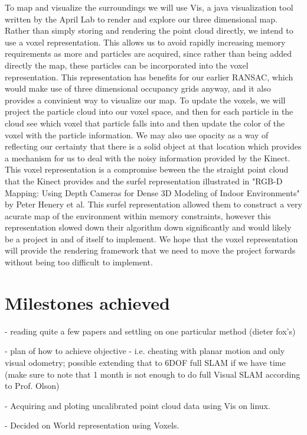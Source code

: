 \documentclass[12pt]{article}
\begin{document}
	To map and visualize the surroundings we will use Vis, a java visualization tool written by the April Lab to render and explore our three dimensional map.   Rather than simply storing and rendering the point cloud directly, we intend to use a voxel representation.  This allows us to avoid rapidly increasing memory requirements as more and particles are acquired, since rather than being added directly the map, these particles can be incorporated into the voxel representation.  This representation has benefits for our earlier RANSAC, which would make use of three dimensional occupancy grids anyway, and it also provides a convinient way to visualize our map.  To update the voxels, we will project the particle cloud into our voxel space, and then for each particle in the cloud see which voxel that particle falls into and then update the color of the voxel with the particle information.  We may also use opacity as a way of reflecting our certainty that there is a solid object at that location which provides a mechanism for us to deal with the noisy information provided by the Kinect.  This voxel representation is a compromise beween the the straight point cloud that the Kinect provides and the surfel representation illustrated in "RGB-D Mapping: Using Depth Cameras for Dense 3D Modeling of Indoor Environments" by Peter Henery et al. This surfel representation allowed them to construct a very acurate map of the environment within memory constraints, however this representation slowed down their algorithm down significantly and would likely be a project in and of itself to implement.  We hope that the voxel representation will provide the rendering framework that we need to move the project forwards without being too difficult to implement. 

\section{Milestones achieved}
- reading quite a few papers and settling on one particular method (dieter fox's)

 - plan of how to achieve objective - i.e. cheating with planar motion and only visual odometry; possible extending that to 6DOF full SLAM if we have time (make sure to note that 1 month is not enough to do full Visual SLAM according to Prof. Olson)

- Acquiring and ploting uncalibrated point cloud data using Vis on linux.

- Decided on World representation using Voxels.
\end{document}
